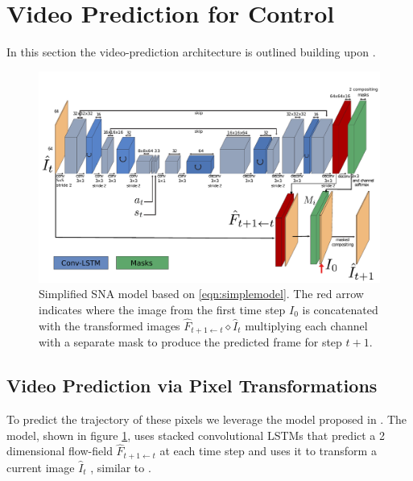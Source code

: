 \section{Video Prediction for Control}
\label{sec:model}
In this section the video-prediction architecture is outlined building upon \cite{finn_nips}.

\begin{figure}[t]
    \centering
    \includegraphics[width=\columnwidth]{images_sna/occlusionaware/architecture.pdf}
    \caption{\small{Simplified SNA model based on \autoref{eqn:simplemodel}. The red arrow indicates where the image from the first time step $I_0$ is concatenated with the transformed images $\hat{F}_{t+1 \leftarrow t} \diamond  \hat{I}_t $ multiplying each channel with a separate mask to produce the predicted frame for step $t+1$.}}      \label{fig:occlusion_model}
\end{figure}

\subsection{Video Prediction via Pixel Transformations}
\label{subsec:pixel_trafo}
To predict the trajectory of these pixels we leverage the model proposed in \cite{finn_nips}. The model, shown in figure \ref{fig:occlusion_model}, uses stacked convolutional LSTMs that predict a 2 dimensional flow-field $\hat{F}_{t+1 \leftarrow t}$ at each time step and uses it to transform a current image $\hat{I}_t$ , similar to \cite{zhou2016view}.

